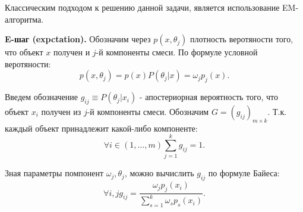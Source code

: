 \documentclass[12pt,a4paper]{report}
\begin{document}
Классическим подходом к решению данной задачи, является использование EM-алгоритма.

\textbf{E-шаг (expctation).}
Обозначим через $p(x, \theta_j)$ плотность веротяности того, что объект $x$ получен и $j$-й компоненты смеси. По формуле условной веротяности:
\begin{equation*}
p(x, \theta_j) = p(x)P(\theta_j|x) = \omega_jp_j(x).
\end{equation*} 

Введем обозначение $g_{ij} \equiv P(\theta_j|x_i)$ - апостериорная вероятность того, что объект $x_i$ получен из $j$-й компоненты смеси. Обозначим $G=(g_{ij})_{m \times k}$. Т.к. каждый объект принадлежит какой-либо компоненте:
\begin{equation*}
\forall i \in (1, \dots, m) \sum_{j=1}^{k}g_{ij} = 1.
\end{equation*}

Зная параметры помпонент $\omega_j, \theta_j$, можно вычислить $g_{ij}$ по формуле Байеса:
\begin{equation*}
\forall i,j g_{ij} = \frac{\omega_jp_j(x_i)}{\sum_{s=1}^{k}\omega_sp_s(x_i)}.
\end{equation*}
\end{document}
